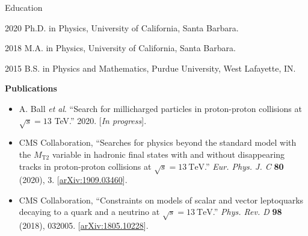 \begin{vitae}

\begin{vitaesection}{Education}
\vspace{-0.1cm}
\item [2020] Ph.D. in Physics, University of California, Santa Barbara.
\item [2018] M.A. in Physics, University of California, Santa Barbara.
\item [2015] B.S. in Physics and Mathematics, Purdue University, West Lafayette, IN.
\end{vitaesection}

\vspace{0.5cm}
\textbf{Publications}


\begin{itemize}

\item A. Ball \textit{et al}. ``Search for millicharged particles in proton-proton collisions at $\sqrt{s}=13$ TeV.''
2020. [\textit{In progress}].

\item CMS Collaboration, ``Searches for physics beyond the standard model with the $M_\mathrm{T2}$ variable in hadronic
  final states with and without disappearing tracks in proton-proton collisions at $\sqrt{s}=13~\mathrm{TeV}$.''
  \textit{Eur. Phys. J. C} \textbf{80} (2020), 3.
  [\href{https://arxiv.org/abs/1909.03460}{arXiv:1909.03460}].

\item CMS Collaboration, ``Constraints on models of scalar and vector leptoquarks decaying to a quark
  and a neutrino at $\sqrt{s}=13~\mathrm{TeV}$.'' \textit{Phys. Rev. D}
  \textbf{98} (2018), 032005. 
  [\href{https://arxiv.org/abs/1805.10228}{arXiv:1805.10228}].


\end{itemize}
\end{vitae}
